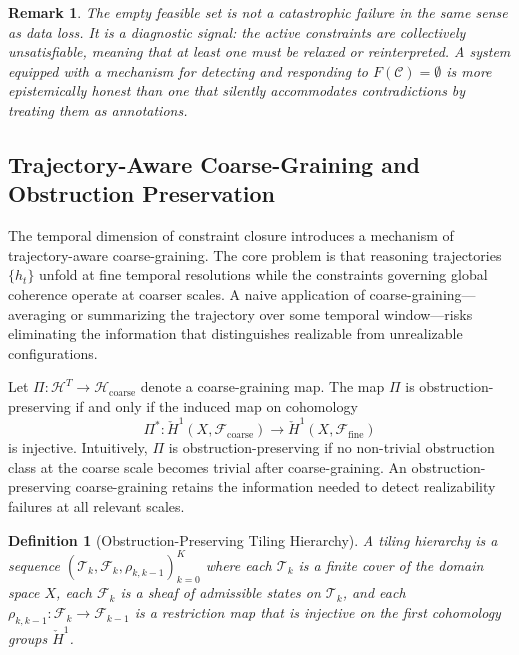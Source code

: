 \documentclass[12pt, oneside]{article}
\newtheorem{definition}{Definition}
\newtheorem{remark}{Remark}
\begin{document}
\begin{remark}
The empty feasible set is not a catastrophic failure in the same sense as data loss. It is a diagnostic signal: the active constraints are collectively unsatisfiable, meaning that at least one must be relaxed or reinterpreted. A system equipped with a mechanism for detecting and responding to $F(\mathcal{C}) = \emptyset$ is more epistemically honest than one that silently accommodates contradictions by treating them as annotations.
\end{remark}

\subsection{Trajectory-Aware Coarse-Graining and Obstruction Preservation}

The temporal dimension of constraint closure introduces a mechanism of trajectory-aware coarse-graining. The core problem is that reasoning trajectories $\{h_t\}$ unfold at fine temporal resolutions while the constraints governing global coherence operate at coarser scales. A naive application of coarse-graining---averaging or summarizing the trajectory over some temporal window---risks eliminating the information that distinguishes realizable from unrealizable configurations.

Let $\Pi : \mathcal{H}^T \to \mathcal{H}_{\text{coarse}}$ denote a coarse-graining map. The map $\Pi$ is obstruction-preserving if and only if the induced map on cohomology
\begin{equation}
  \Pi^* : \check{H}^1(X, \mathcal{F}_{\text{coarse}}) \to \check{H}^1(X, \mathcal{F}_{\text{fine}})
\end{equation}
is injective. Intuitively, $\Pi$ is obstruction-preserving if no non-trivial obstruction class at the coarse scale becomes trivial after coarse-graining. An obstruction-preserving coarse-graining retains the information needed to detect realizability failures at all relevant scales.

\begin{definition}[Obstruction-Preserving Tiling Hierarchy]
A tiling hierarchy is a sequence $(\mathcal{T}_k, \mathcal{F}_k, \rho_{k, k-1})_{k=0}^K$ where each $\mathcal{T}_k$ is a finite cover of the domain space $X$, each $\mathcal{F}_k$ is a sheaf of admissible states on $\mathcal{T}_k$, and each $\rho_{k, k-1} : \mathcal{F}_k \to \mathcal{F}_{k-1}$ is a restriction map that is injective on the first cohomology groups $\check{H}^1$.
\end{definition}
\end{document}
